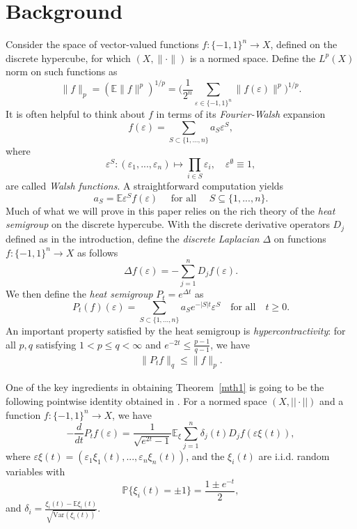 \section{Background}

Consider the space of vector-valued functions $f:\{-1,1\}^n \rightarrow X$, defined on the discrete hypercube, for which $(X,\|\cdot\|)$ is a normed space.  Define the $L^p(X)$ norm on such functions as 
\[\|f\|_{p}  = \left(\mathbb{E}\|f\|^p \right)^{1/p} = \Big(\frac{1}{2^n}\sum\limits_{\varepsilon \in \{-1,1\}^n} \|f(\varepsilon)\|^p \Big)^{1/p}.\]
It is often helpful to think about $f$ in terms of its  \textit{Fourier-Walsh} expansion
\[f(\varepsilon) = \sum_{S \subset \{1,...,n\}} a_S\varepsilon^S,\]
where 
\[\varepsilon^S: (\varepsilon_1,...,\varepsilon_n) \longmapsto \prod\limits_{i \in S} \varepsilon_{i}, \quad \varepsilon^{\emptyset} \equiv 1,\]
are called \textit{Walsh functions}.  A  straightforward computation yields 
\[a_S = \mathbb{E}\varepsilon^{S}f(\varepsilon) \quad \text{ for all } \quad S\subseteq \{1,...,n\}.\]
Much of what we will prove in this paper relies on the rich theory of the \textit{heat semigroup} on the discrete hypercube.  With the discrete derivative operators $D_j$ defined as in the introduction, define the \textit{discrete Laplacian} $\Delta$ on functions $f:\{-1,1\}^n \to X$ as follows
\[\Delta f(\varepsilon)= - \sum_{j=1}^{n} D_{j} f(\varepsilon).\]
We then define the \textit{heat semigroup} $P_t = e^{\Delta t}$ as
\[P_{t}(f)(\varepsilon) = \sum_{S \subset \{1,...,n\}} a_Se^{-|S|t}\varepsilon^S \quad \text{for all}\quad t \geq 0.\]
An important property satisfied by the heat semigroup is \textit{hypercontractivity}: for all $p,q$ satisfying $1 < p \leq q < \infty$ and $e^{-2t} \leq \frac{p-1}{q-1}$, we have   
\begin{align}\label{hyp1}
\|P_t f\|_{q} \leq \|f\|_{p}.
\end{align}


One of the key ingredients in obtaining Theorem~\ref{mth1}  is going to be the following pointwise identity obtained in \cite{IVHV}.  For a normed space $(X,||\cdot||)$ and a function $f:\{-1,1\}^n \to X$, we have 
\begin{equation}
    -\frac{d}{dt}P_t f(\varepsilon) = \frac{1}{\sqrt{e^{2t} - 1}}\mathbb{E}_\xi \sum_{j=1}^n \delta_j(t) D_j f(\varepsilon\xi(t)), \label{heat}
\end{equation}
where $\varepsilon\xi(t) = (\varepsilon_1\xi_1(t),...,\varepsilon_n\xi_n(t))$, and the $\xi_i(t)$ are i.i.d. random variables with
\[\mathbb{P}\{\xi_i(t) = \pm 1\} = \frac{1\pm e^{-t}}{2},\]
and   $\delta_i = \frac{\xi_i(t) - \mathbb{E} \xi_{i}(t)}{\sqrt{\mathrm{Var}(\xi_{i}(t))}}$.  
